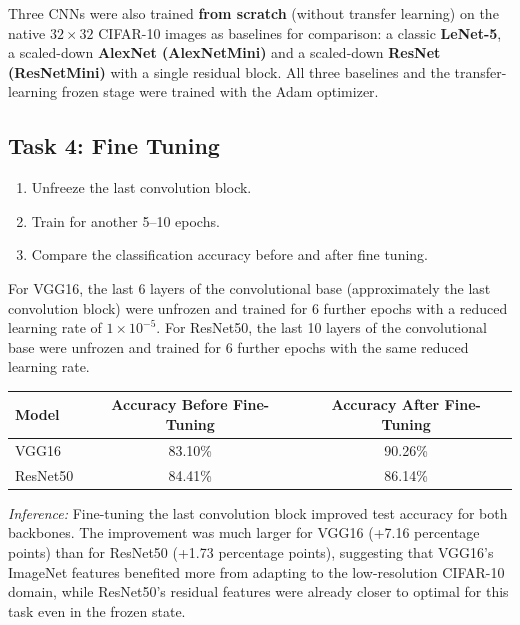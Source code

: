 \documentclass[11pt]{article}
\begin{document}
Three CNNs were also trained \textbf{from scratch} (without transfer
learning) on the native $32\times32$ CIFAR-10 images as baselines for
comparison: a classic \textbf{LeNet-5}, a scaled-down \textbf{AlexNet
(AlexNetMini)} and a scaled-down \textbf{ResNet (ResNetMini)} with a
single residual block. All three baselines and the transfer-learning
frozen stage were trained with the Adam optimizer.


\subsection*{Task 4: Fine Tuning}

\begin{enumerate}

\item Unfreeze the last convolution block.

\item Train for another 5--10 epochs.

\item Compare the classification accuracy before and after fine tuning.

\end{enumerate}

For VGG16, the last 6 layers of the convolutional base (approximately the
last convolution block) were unfrozen and trained for 6 further epochs
with a reduced learning rate of $1\times10^{-5}$. For ResNet50, the last
10 layers of the convolutional base were unfrozen and trained for 6
further epochs with the same reduced learning rate.

\begin{center}
\begin{tabular}{|l|c|c|}
\hline
Model & Accuracy Before Fine-Tuning & Accuracy After Fine-Tuning\\
\hline
VGG16 & 83.10\% & 90.26\%\\
ResNet50 & 84.41\% & 86.14\%\\
\hline
\end{tabular}
\end{center}

\textit{Inference:} Fine-tuning the last convolution block improved test
accuracy for both backbones. The improvement was much larger for VGG16
(+7.16 percentage points) than for ResNet50 (+1.73 percentage points),
suggesting that VGG16's ImageNet features benefited more from adapting to
the low-resolution CIFAR-10 domain, while ResNet50's residual features
were already closer to optimal for this task even in the frozen state.
\end{document}
